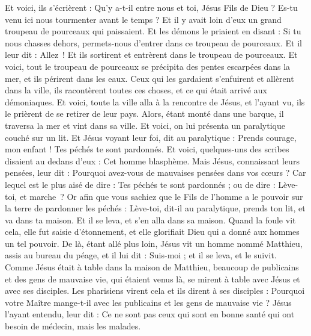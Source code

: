 \begin{multicols}{2}
{Et voici, ils s'écrièrent : Qu'y a-t-il entre nous et toi, Jésus Fils de Dieu ? Es-tu venu ici nous tourmenter avant le temps ?
Et il y avait loin d'eux un grand troupeau de pourceaux qui paissaient.
Et les démons le priaient en disant : Si tu nous chasses dehors, permets-nous d’entrer dans ce troupeau de pourceaux.
Et il leur dit : Allez ! Et ils sortirent et entrèrent dans le troupeau de pourceaux. Et voici, tout le troupeau de pourceaux se précipita des pentes escarpées dans la mer, et ils périrent dans les eaux.
Ceux qui les gardaient s'enfuirent et allèrent dans la ville, ils racontèrent toutes ces choses, et ce qui était arrivé aux démoniaques.
Et voici, toute la ville alla à la rencontre de Jésus, et l'ayant vu, ils le prièrent de se retirer de leur pays.
\VerseOne{}Alors, étant monté dans une barque, il traversa la mer et vint dans sa ville.
Et voici, on lui présenta un paralytique couché sur un lit. Et Jésus voyant leur foi, dit au paralytique : Prends courage, mon enfant ! Tes péchés te sont pardonnés.
Et voici, quelques-uns des scribes disaient au dedans d’eux : Cet homme blasphème.
Mais Jésus, connaissant leurs pensées, leur dit : Pourquoi avez-vous de mauvaises pensées dans vos cœurs ?
Car lequel est le plus aisé de dire : Tes péchés te sont pardonnés ; ou de dire : Lève-toi, et marche ?
Or afin que vous sachiez que le Fils de l'homme a le pouvoir sur la terre de pardonner les péchés : Lève-toi, dit-il au paralytique, prends ton lit, et va dans ta maison.
Et il se leva, et s'en alla dans sa maison.
Quand la foule vit cela, elle fut saisie d’étonnement, et elle glorifiait Dieu qui a donné aux hommes un tel pouvoir.
De là, étant allé plus loin, Jésus vit un homme nommé Matthieu, assis au bureau du péage, et il lui dit : Suis-moi ; et il se leva, et le suivit.
Comme Jésus était à table dans la maison de Matthieu, beaucoup de publicains et des gens de mauvaise vie, qui étaient venus là, se mirent à table avec Jésus et avec ses disciples.
Les pharisiens virent cela et ils dirent à ses disciples : Pourquoi votre Maître mange-t-il avec les publicains et les gens de mauvaise vie ?
Jésus l'ayant entendu, leur dit : Ce ne sont pas ceux qui sont en bonne santé qui ont besoin de médecin, mais les malades.
}
\end{multicols}
